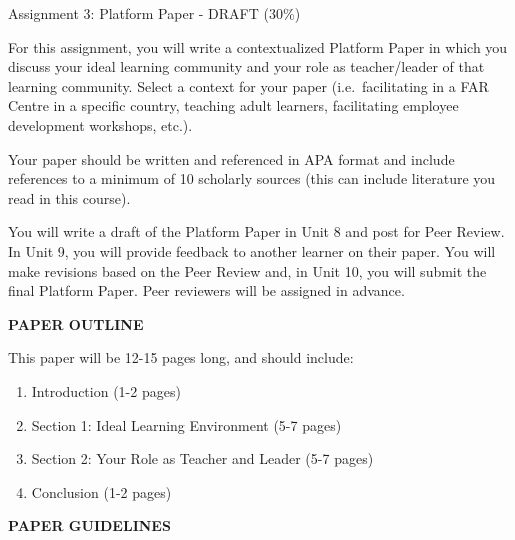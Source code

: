 \documentclass[
]{book}
\providecommand{\tightlist}{%
  \setlength{\itemsep}{0pt}\setlength{\parskip}{0pt}}
\begin{document}
\begin{assessment}
{Assignment 3: Platform Paper - DRAFT (30\%)}

For this assignment, you will write a contextualized Platform Paper in
which you discuss your ideal learning community and your role as
teacher/leader of that learning community. Select a context for your
paper (i.e.~facilitating in a FAR Centre in a specific country, teaching
adult learners, facilitating employee development workshops, etc.).

Your paper should be written and referenced in APA format and include
references to a minimum of 10 scholarly sources (this can include
literature you read in this course).

You will write a draft of the Platform Paper in Unit 8 and post for Peer
Review. In Unit 9, you will provide feedback to another learner on their
paper. You will make revisions based on the Peer Review and, in Unit 10,
you will submit the final Platform Paper. Peer reviewers will be
assigned in advance.

\textbf{PAPER OUTLINE}

This paper will be 12-15 pages long, and should include:

\begin{enumerate}
\def\labelenumi{\arabic{enumi}.}
\tightlist
\item
  Introduction (1-2 pages)\\
\item
  Section 1: Ideal Learning Environment (5-7 pages)\\
\item
  Section 2: Your Role as Teacher and Leader (5-7 pages)\\
\item
  Conclusion (1-2 pages)
\end{enumerate}

\textbf{PAPER GUIDELINES}


\end{assessment}
\end{document}
